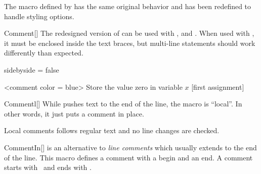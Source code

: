 \documentclass[a4paper, 11pt]{article}
\begin{document}
The  macro defined by  has the same original behavior and has been redefined to handle styling options.

\begin{macro}{Comment}[]
    The redesigned version of  can be used with ,  and . When used with , it must be enclosed inside the text braces, but multi-line statements should work differently than expected.

    \MacroOptionsText
\end{macro}

\begin{tcblisting}{sidebyside = false}
    \begin{minipage}{7.5cm}
        \begin{algorithmic}<comment color = blue>%
        \State Store the value zero in variable $x$
        [first assignment]%
        \end{algorithmic}
    \end{minipage}
\end{tcblisting}

\begin{macro}{Commentl}[]
    While  pushes text to the end of the line, the macro  is ``local''. In other words, it just puts a comment in place.

    Local comments follows regular text and no line changes are checked.

    \MacroOptionsText
\end{macro}

\begin{tcblisting}{}
    \begin{algorithmic}
        \EndIf
    \end{algorithmic}
\end{tcblisting}

\begin{macro}{CommentIn}[]
     is an alternative to \textit{line comments} which usually extends to the end of the line. This macro defines a comment with a begin and an end. A comment starts with \CommentSymbol\ and ends with \CommentSymbolRight.

    \MacroOptionsText
\end{macro}
\end{document}
